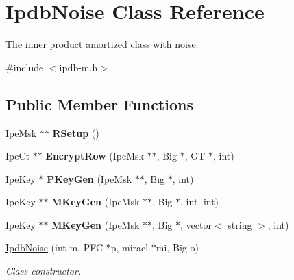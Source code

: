 \hypertarget{classIpdbNoise}{}\section{Ipdb\+Noise Class Reference}
\label{classIpdbNoise}


The inner product amortized class with noise.  




{\ttfamily \#include $<$ipdb-\/m.\+h$>$}

\subsection*{Public Member Functions}
\begin{DoxyCompactItemize}
\item 
Ipe\+Msk $\ast$$\ast$ {\bfseries R\+Setup} ()\hypertarget{classIpdbNoise_a1bc038260c261e8ad12d89652ec330c3}{}\label{classIpdbNoise_a1bc038260c261e8ad12d89652ec330c3}

\item 
Ipe\+Ct $\ast$$\ast$ {\bfseries Encrypt\+Row} (Ipe\+Msk $\ast$$\ast$, Big $\ast$, GT $\ast$, int)\hypertarget{classIpdbNoise_aec8bd41beb6bccb721c059e2c4032fce}{}\label{classIpdbNoise_aec8bd41beb6bccb721c059e2c4032fce}

\item 
Ipe\+Key $\ast$ {\bfseries P\+Key\+Gen} (Ipe\+Msk $\ast$$\ast$, Big $\ast$, int)\hypertarget{classIpdbNoise_a38341b674887eeeee0d057fc2fa3bf72}{}\label{classIpdbNoise_a38341b674887eeeee0d057fc2fa3bf72}

\item 
Ipe\+Key $\ast$$\ast$ {\bfseries M\+Key\+Gen} (Ipe\+Msk $\ast$$\ast$, Big $\ast$, int, int)\hypertarget{classIpdbNoise_a0881cb3b4e17561e4343b4fc41609037}{}\label{classIpdbNoise_a0881cb3b4e17561e4343b4fc41609037}

\item 
Ipe\+Key $\ast$$\ast$ {\bfseries M\+Key\+Gen} (Ipe\+Msk $\ast$$\ast$, Big $\ast$, vector$<$ string $>$, int)\hypertarget{classIpdbNoise_a3ef63f8bd504cc6b1957c404ebfc48da}{}\label{classIpdbNoise_a3ef63f8bd504cc6b1957c404ebfc48da}

\item 
\hyperlink{classIpdbNoise_a8083deed2e41b9daa310762b324276f0}{Ipdb\+Noise} (int m, P\+FC $\ast$p, miracl $\ast$mi, Big o)
\begin{DoxyCompactList}\small\item\em Class constructor. \end{DoxyCompactList}\end{DoxyCompactItemize}
